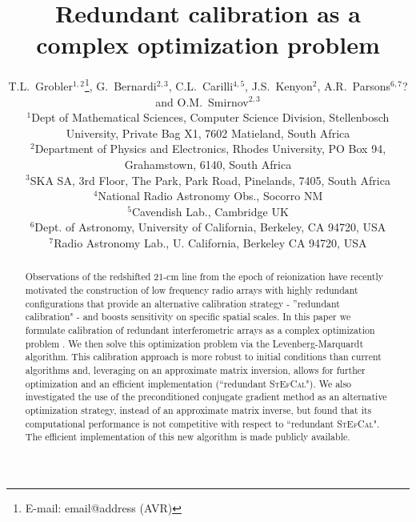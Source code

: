 \documentclass[useAMS,usenatbib]{mn2e}
\title[Redundant interferometric calibration as a complex optimization problem]{Redundant calibration as a complex optimization problem}
\author[T.L.~Grobler et al.]{T.L.~Grobler$^{1,2}$\thanks{E-mail: email@address (AVR)}, G.~Bernardi$^{2,3}$, C.L.~Carilli$^{4,5}$, J.S.~Kenyon$^{2}$, A.R.~Parsons$^{6,7}$? \newauthor and O.M.~Smirnov$^{2,3}$\\
$^{1}$Dept of Mathematical Sciences, Computer Science Division, Stellenbosch University, Private Bag X1, 7602 Matieland, South Africa\\
$^{2}$Department of Physics and Electronics, Rhodes University, PO Box 94, Grahamstown, 6140, South Africa\\
$^{3}$SKA SA, 3rd Floor, The Park, Park Road, Pinelands, 7405, South Africa\\
$^{4}$National Radio Astronomy Obs., Socorro NM\\
$^{5}$Cavendish Lab., Cambridge UK\\
$^{6}$Dept. of Astronomy, University of California, Berkeley, CA 94720, USA\\
$^{7}$Radio Astronomy Lab., U. California, Berkeley CA 94720, USA}
\begin{document}

\pagerange{\pageref{firstpage}--\pageref{lastpage}} 

\maketitle

\label{firstpage}

\begin{abstract}
Observations of the redshifted 21-cm line from the epoch of reionization have recently motivated the construction of low 
frequency radio arrays with highly redundant configurations that provide an alternative calibration strategy - 
''redundant calibration" - and boosts sensitivity on specific spatial scales. In this paper we formulate 
calibration of redundant interferometric arrays as a complex optimization problem \citep[i.e.,][]{Smirnov2015}. 
We then solve this optimization problem via the Levenberg-Marquardt algorithm. This calibration approach is more 
robust to initial conditions than current algorithms and, leveraging on an approximate matrix inversion, allows for further optimization and an efficient implementation (``redundant \textsc{StEfCal}"). We also investigated the use of the preconditioned conjugate gradient method as an alternative optimization strategy, instead of 
an approximate matrix inverse, but found that its computational performance is not competitive with respect to ``redundant \textsc{StEfCal}". The efficient implementation of this new algorithm is made publicly available.

\end{abstract}
\end{document}
